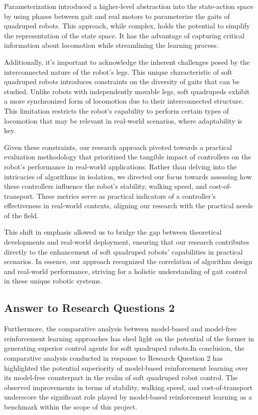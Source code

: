 Parameterization introduced a higher-level abstraction into the state-action space by using phases between gait and real motors to parameterize the gaits of quadruped robots. This approach, while complex, holds the potential to simplify the representation of the state space. It has the advantage of capturing critical information about locomotion while streamlining the learning process.

Additionally, it's important to acknowledge the inherent challenges posed by the interconnected nature of the robot's legs. This unique characteristic of soft quadruped robots introduces constraints on the diversity of gaits that can be studied. Unlike robots with independently movable legs, soft quadrupeds exhibit a more synchronized form of locomotion due to their interconnected structure. This limitation restricts the robot's capability to perform certain types of locomotion that may be relevant in real-world scenarios, where adaptability is key.

Given these constraints, our research approach pivoted towards a practical evaluation methodology that prioritized the tangible impact of controllers on the robot's performance in real-world applications. Rather than delving into the intricacies of algorithms in isolation, we directed our focus towards assessing how these controllers influence the robot's stability, walking speed, and cost-of-transport. These metrics serve as practical indicators of a controller's effectiveness in real-world contexts, aligning our research with the practical needs of the field.

This shift in emphasis allowed us to bridge the gap between theoretical developments and real-world deployment, ensuring that our research contributes directly to the enhancement of soft quadruped robots' capabilities in practical scenarios. In essence, our approach recognized the correlation of algorithm design and real-world performance, striving for a holistic understanding of gait control in these unique robotic systems.

\subsection{Answer to Research Questions 2}
Furthermore, the comparative analysis between model-based and model-free reinforcement learning approaches has shed light on the potential of the former in generating superior control agents for soft quadruped robots.In conclusion, the comparative analysis conducted in response to Research Question 2 has highlighted the potential superiority of model-based reinforcement learning over its model-free counterpart in the realm of soft quadruped robot control. The observed improvements in terms of stability, walking speed, and cost-of-transport underscore the significant role played by model-based reinforcement learning as a benchmark within the scope of this project.

